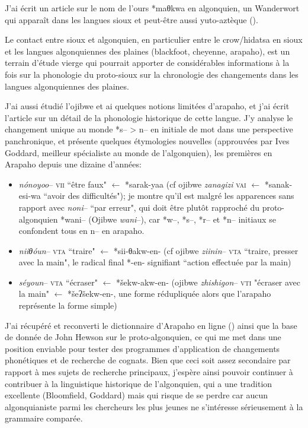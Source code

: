 \documentclass[oldfontcommands,oneside,a4paper,11pt]{memoir}
\begin{document}
J'ai écrit un article sur le nom de l'ours *maθkwa en algonquien, un Wanderwort qui apparaît dans les langues sioux et peut-être aussi yuto-aztèque (\citealt{jacques12bear}).

Le contact entre sioux et algonquien, en particulier entre le crow/hidatsa en sioux et les langues algonquiennes des plaines (blackfoot, cheyenne, arapaho), est un terrain d'étude vierge qui pourrait apporter de considérables informations à la fois sur la phonologie du proto-sioux sur la chronologie des changements dans les langues algonquiennes des plaines.


J'ai aussi étudié l'ojibwe et ai quelques notions limitées d'arapaho, et j'ai écrit l'article \citet{jacques13arapaho} sur un détail de la phonologie historique de cette langue. J'y analyse le changement unique au monde *s-- > n-- en initiale de mot dans une perspective panchronique, et présente quelques étymologies nouvelles (approuvées par Ives Goddard, meilleur spécialiste au monde de l'algonquien), les premières en Arapaho depuis une dizaine d'années:
\begin{itemize}
\item  \textit{nónoyoo}-- \textsc{vii} ``être faux" $\leftarrow$ *sarak-yaa (cf ojibwe \textit{zanagizi} \textsc{vai} $\leftarrow$ *sanak-esi-wa ``avoir des difficultés"); je montre qu'il est malgré les apparences sans rapport avec \textit{noni}-- ``par erreur", qui doit être plutôt rapproché du proto-algonquien *wani-- (Ojibwe \textit{wani}--), car *w--, *s--, *r-- et *n-- initiaux se confondent tous en n-- en arapaho.

\item  \textit{niiθóun}-- \textsc{vta} ``traire" $\leftarrow$ *sii-θakw-en- (cf ojibwe \textit{ziinin}-- \textsc{vta} ``traire, presser avec la main", le radical final *-en- signifiant ``action effectuée par la main)

\item \textit{séyoun}-- \textsc{vta} ``écraser" $\leftarrow$ *šekw-akw-en- (ojibwe \textit{zhishigon}-- \textsc{vti} "écraser avec la main" $\leftarrow$ *šeʔšekw-en-, une forme rédupliquée alors que l'arapaho représente la forme simple)

\end{itemize}

J'ai récupéré et  reconverti le dictionnaire d'Arapaho en ligne (\citealt{conathan06arapaho}) ainsi que la base de donnée de John Hewson sur le proto-algonquien, ce qui me met dans une position enviable pour tester des programmes d'application de changements phonétiques et de recherche de cognats. Bien que ceci soit assez secondaire par rapport à mes sujets de recherche principaux, j'espère ainsi pouvoir continuer à contribuer à la linguistique historique de l'algonquien, qui a une tradition excellente (Bloomfield, Goddard) mais qui risque de se perdre car aucun algonquianiste parmi les chercheurs les plus jeunes ne s'intéresse sérieusement à la grammaire comparée.
\end{document}
